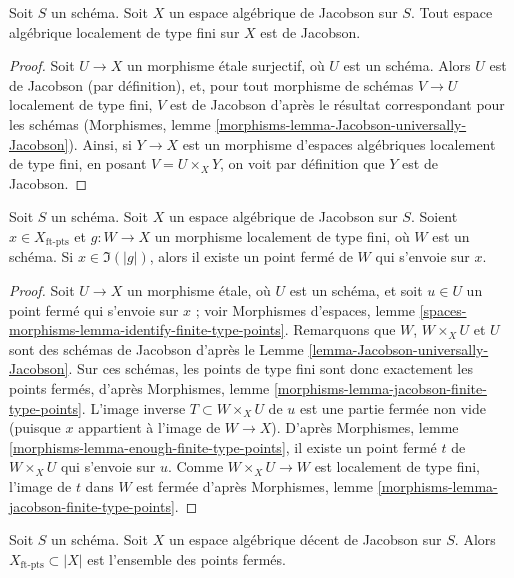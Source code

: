 \begin{lemma}
\label{lemma-Jacobson-universally-Jacobson}
Soit $S$ un schéma. Soit $X$ un espace algébrique de Jacobson sur $S$.
Tout espace algébrique localement de type fini sur $X$ est de Jacobson.
\end{lemma}

\begin{proof}
Soit $U \to X$ un morphisme étale surjectif, où $U$ est un schéma.
Alors $U$ est de Jacobson (par définition), et, pour tout morphisme de schémas
$V \to U$ localement de type fini, $V$ est de Jacobson d'après le résultat
correspondant pour les schémas (Morphismes, lemme
\ref{morphisms-lemma-Jacobson-universally-Jacobson}).
Ainsi, si $Y \to X$ est un morphisme d'espaces algébriques localement de type
fini, en posant $V = U \times_X Y$, on voit par définition que $Y$ est de
Jacobson.
\end{proof}

\begin{lemma}
\label{lemma-Jacobson-ft-points-lift-to-closed}
Soit $S$ un schéma. Soit $X$ un espace algébrique de Jacobson sur $S$.
Soient $x \in X_{\text{ft-pts}}$ et $g : W \to X$ un morphisme localement de
type fini, où $W$ est un schéma. Si $x \in \Im(|g|)$, alors il existe un point
fermé de $W$ qui s'envoie sur $x$.
\end{lemma}

\begin{proof}
Soit $U \to X$ un morphisme étale, où $U$ est un schéma, et soit $u \in U$
un point fermé qui s'envoie sur $x$ ; voir Morphismes d'espaces, lemme
\ref{spaces-morphisms-lemma-identify-finite-type-points}.
Remarquons que $W$, $W \times_X U$ et $U$ sont des schémas de Jacobson d'après
le Lemme \ref{lemma-Jacobson-universally-Jacobson}.
Sur ces schémas, les points de type fini sont donc exactement les points
fermés, d'après Morphismes, lemme
\ref{morphisms-lemma-jacobson-finite-type-points}.
L'image inverse $T \subset W \times_X U$ de $u$ est une partie fermée non vide
(puisque $x$ appartient à l'image de $W \to X$).
D'après Morphismes, lemme \ref{morphisms-lemma-enough-finite-type-points},
il existe un point fermé $t$ de $W \times_X U$ qui s'envoie sur $u$.
Comme $W \times_X U \to W$ est localement de type fini, l'image de $t$ dans
$W$ est fermée d'après Morphismes, lemme
\ref{morphisms-lemma-jacobson-finite-type-points}.
\end{proof}

\begin{lemma}
\label{lemma-decent-Jacobson-ft-pts}
Soit $S$ un schéma. Soit $X$ un espace algébrique décent de Jacobson sur $S$.
Alors $X_{\text{ft-pts}} \subset |X|$ est l'ensemble des points fermés.
\end{lemma}

